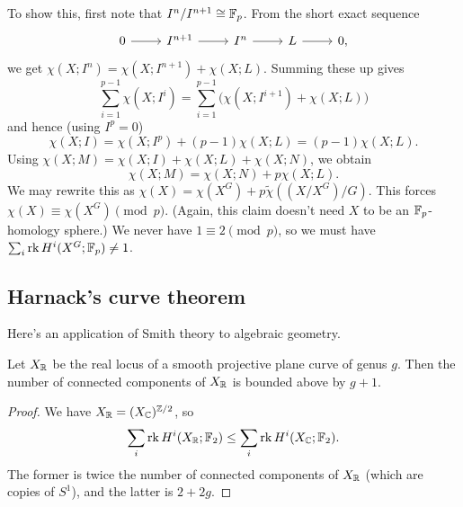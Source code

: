 \documentclass{article}
\begin{document}
To show this, first note that $I^n / I^{n+1} \cong \mathbb{F}_p$.
From the short exact sequence
\[
  \begin{tikzcd}
    0 \rar & I^{n+1} \rar & I^n \rar & L \rar & 0,
  \end{tikzcd}
\]
we get $\chi(X; I^n) = \chi(X; I^{n+1}) + \chi(X; L)$.
Summing these up gives
\[
  \sum_{i=1}^{p-1} \chi(X; I^i) = \sum_{i=1}^{p-1} \big(\chi(X; I^{i+1}) + \chi(X; L)\big)
\]
and hence (using $I^p = 0$)
\[
  \chi(X; I) = \chi(X; I^p) + (p - 1) \chi(X; L) = (p - 1) \chi(X; L).
\]
Using $\chi(X; M) = \chi(X; I) + \chi(X; L) + \chi(X; N)$, we obtain
\[
  \chi(X; M) = \chi(X; N) + p \chi(X; L).
\]
We may rewrite this as $\chi(X) = \chi(X^G) + p \tilde{\chi}((X / X^G) / G)$.
This forces $\chi(X) \equiv \chi(X^G) \pmod p$.
(Again, this claim doesn't need $X$ to be an $\mathbb{F}_p$-homology sphere.)
We never have $1 \equiv 2 \pmod p$, so we must have $\sum_i \operatorname{rk} H^i(X^G; \mathbb{F}_p) \neq 1$.

\subsection{Harnack's curve theorem}

Here's an application of Smith theory to algebraic geometry.

\begin{thm}[Harnack]
  Let $X_{\mathbb{R}}$ be the real locus of a smooth projective plane curve of genus $g$.
  Then the number of connected components of $X_{\mathbb{R}}$ is bounded above by $g + 1$.
\end{thm}

\begin{proof}
  We have $X_{\mathbb{R}} = (X_{\mathbb{C}})^{\mathbb{Z}/2}$, so
  \[
    \sum_i \operatorname{rk} H^i(X_{\mathbb{R}}; \mathbb{F}_2) \leq \sum_i \operatorname{rk} H^i(X_{\mathbb{C}}; \mathbb{F}_2).
  \]
  The former is twice the number of connected components of $X_{\mathbb{R}}$ (which are copies of $S^1$), and the latter is $2 + 2g$.
\end{proof}
\end{document}
